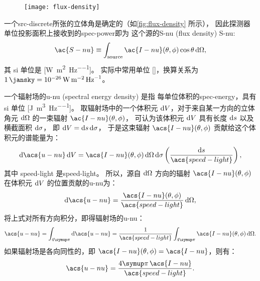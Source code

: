 \begin{figure}[htp]
  \centering
  \texttt{[image: flux-density]}
  \label{fig:flux-density}
\end{figure}

一个\ac{src-discrete}所张的立体角是确定的（如\autoref{fig:flux-density} 所示），
因此探测器单位投影面积上接收到的\ac{spec-power}即为
这个源的\acl{S-nu} (flux density) \ac{S-nu}:
\begin{equation}
  \label{eq:flux-density}
  \ac{S-nu} \equiv
    \int_{\R{source}} \ac{I-nu}(\theta,\phi) \cos\theta \,\D{\Omega} ,
\end{equation}
其 \ac{si} 单位是 [\si{\watt\per\square\meter\per\hertz}]。
实际中常用单位 [\si{\jansky}]，换算关系为
$\SI{1}{\jansky} = \SI{e-26}{\watt\per\square\meter\per\hertz}$。

一个辐射场的\acl{u-nu} (spectral energy density) 是指
每单位体积的\ac{spec-energy}，具有 \ac{si} 单位
[\si{\joule\per\cubic\meter\per\hertz}]。
取辐射场中的一个体积元 $\mathrm{d}V$，对于来自某一方向的立体角元 $\mathrm{d}\Omega$
的一束辐射 $\ac{I-nu}(\theta,\phi)$，
可认为该体积元 $\mathrm{d}V$ 具有长度 $\mathrm{d}s$ 以及横截面积 $\mathrm{d}\sigma$，
即 $\mathrm{d}V = \mathrm{d}s\,\mathrm{d}\sigma$，
于是这束辐射 $\acs{I-nu}(\theta,\phi)$ 贡献给这个体积元的谱能量为：
\begin{equation}
  \D{\acs{u-nu}}\,\D{V}
    = \acs{I-nu}(\theta,\phi) \,\D{\Omega}\,\D{\sigma}
      \left( \frac{\D{s}}{\acs{speed-light}} \right) ,
\end{equation}
其中 \acs{speed-light} 是\acl{speed-light}。
所以，源自 $\mathrm{d}\Omega$ 方向的辐射 $\acs{I-nu}(\theta,\phi)$
在体积元 $\mathrm{d}V$ 的位置贡献的\acl{u-nu}为：
\begin{equation}
  \D{\acs{u-nu}}
    = \frac{\acs{I-nu}(\theta,\phi)}{\acs{speed-light}} \,\D{\Omega} ,
\end{equation}
将上式对所有方向积分，即得辐射场的\acl{u-nu}：
\begin{equation}
  \label{eq:spectral-energy-density}
  \acs{u-nu}
    = \int_{4\Cpi} \D{\acs{u-nu}}
    = \frac{1}{\acs{speed-light}}
      \int_{4\Cpi} \acs{I-nu}(\theta,\phi) \,\D{\Omega} .
\end{equation}
如果辐射场是各向同性的，即 $\acs{I-nu}(\theta,\phi) = \acs{I-nu}$，则有：
\begin{equation}
  \label{eq:spectral-energy-density-iso}
  \acs{u-nu} = \frac{4\Cpi \, \acs{I-nu}}{\acs{speed-light}} .
\end{equation}

